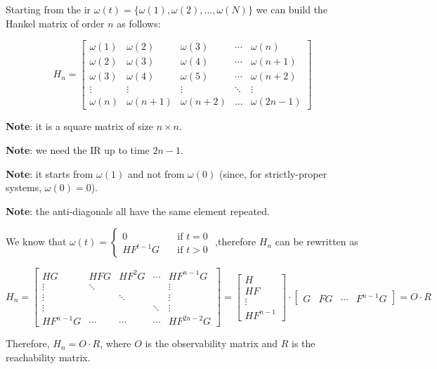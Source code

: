 \begin{defn}
    Starting from the \gls{ir} $\omega(t) = \{\omega(1), \omega(2), \ldots, \omega(N)\}$ we can build the Hankel matrix of order $n$ as follows:

\[
    H_n = \begin{bmatrix}
        \omega(1) & \omega(2) & \omega(3) & \cdots & \omega(n) \\
        \omega(2) & \omega(3) & \omega(4) & \cdots & \omega(n+1) \\
        \omega(3) & \omega(4) & \omega(5) & \cdots & \omega(n+2) \\
        \vdots    & \vdots    & \vdots    & \ddots & \vdots \\
        \omega(n) & \omega(n+1) & \omega(n+2) & \ldots & \omega(2n-1)
    \end{bmatrix}
\]

    \textbf{Note}: it is a square matrix of size $n\times n$.

    \textbf{Note}: we need the IR up to time $2n-1$.

    \textbf{Note}: it starts from $\omega(1)$ and not from $\omega(0)$ (since, for strictly-proper systems, $\omega(0)=0$).

    \textbf{Note}: the anti-diagonals all have the same element repeated.
    
    We know that $\omega(t) = \begin{cases}
    0 &\quad \text{if } t = 0 \\
    HF^{t-1}G &\quad \text{if } t > 0
    \end{cases}$ ,\qquad therefore $H_n$ can be rewritten as

    \[
        H_n = \begin{bmatrix}
            HG     & HFG    & HF^2G  & \cdots & HF^{n-1}G \\
            \vdots & \ddots &        &        & \vdots \\
            \vdots &        & \ddots &        & \vdots \\
            \vdots &        &        & \ddots & \vdots \\
            HF^{n-1}G & \cdots & \cdots & \cdots & HF^{2n-2}G
        \end{bmatrix} = \begin{bmatrix}
            H \\
            HF \\
            \vdots \\
            HF^{n-1}
        \end{bmatrix} \cdot \begin{bmatrix}
            G & FG & \cdots & F^{n-1}G
        \end{bmatrix} = O \cdot R
    \]
    
    
    Therefore, $H_n = O \cdot R$, where $O$ is the observability matrix and $R$ is the reachability matrix.
\end{defn}




